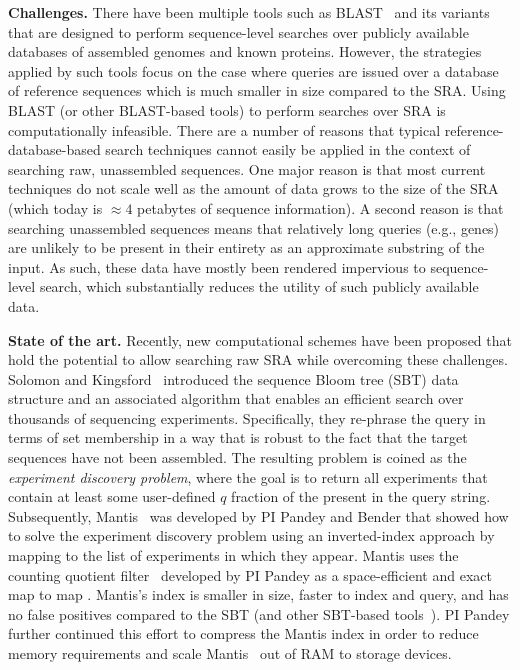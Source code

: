 \noindent
\textbf{Challenges.}
There have been multiple tools such as BLAST~\cite{altschul1990basic} and its variants that are designed to perform sequence-level searches over publicly available databases of assembled genomes and known proteins. %
However, the strategies applied by such tools focus on the case where queries are issued over a database of reference sequences which is much smaller in size compared to the SRA\@.
Using BLAST (or other BLAST-based tools) to perform searches over SRA is computationally infeasible.
%
There are a number of reasons that typical reference-database-based search techniques cannot easily be applied in the context of searching raw, unassembled sequences. One major reason is that most current techniques do not scale well as the amount of data grows to the size of the SRA (which today is $\approx4$ petabytes of sequence information). A second reason is that searching unassembled sequences means that relatively long queries (e.g., genes) are unlikely to be present in their entirety as an approximate substring of the input.
As such, these data have mostly been rendered impervious to sequence-level search, which substantially reduces the utility of such publicly available data.


\noindent
\textbf{State of the art.}
Recently, new computational schemes have been proposed that hold the potential to allow searching raw SRA while overcoming these challenges. Solomon and Kingsford~\cite{solomon2016fast} introduced the sequence Bloom tree (SBT) data structure and an associated algorithm that enables an efficient search over thousands of sequencing experiments. Specifically, they re-phrase the query in terms of \kmer set membership in a way that is robust to the fact that the target sequences have not been assembled. The resulting problem is coined as the \emph{experiment discovery problem}, where the goal is to return all experiments that contain at least some user-defined $q$ fraction of the \kmers present in the query string.
%
Subsequently, Mantis~\cite{PandeyABFJP18Cell} was developed by PI Pandey and Bender that showed how to solve the experiment discovery problem using an inverted-index approach by mapping \kmers to the list of experiments in which they appear. Mantis uses the counting quotient filter~\cite{PandeyBJP17} developed by PI Pandey as a space-efficient and exact map to map \kmers. Mantis's index is smaller in size, faster to index and query, and has no false positives compared to the SBT (and other SBT-based tools~\cite{SolomonK17,HarrisM20,BingmannBGI19}).
%
PI Pandey further continued this effort to compress the Mantis index in order to reduce memory requirements and scale Mantis~\cite{AlmodaresiPFJP19,AlmodaresiPFJP20} out of RAM to storage devices.


